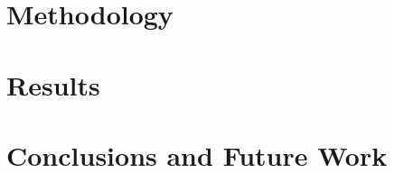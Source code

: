 \documentclass[edeposit,fullpage]{uiucthesis2021}
\newcounter{counterforappendices}
\begin{document}
\chapter{Methodology}
\label{ch:methodology}


\chapter{Results}
\label{ch:results}


\chapter{Conclusions and Future Work}
\label{ch:conclusion}


%
% 

\backmatter

\printbibliography[heading=bibintoc,title={References}]

\clearpage
\setcounter{counterforappendices}{\value{page}}
\mainmatter
\setcounter{page}{\value{counterforappendices}}
\end{document}
